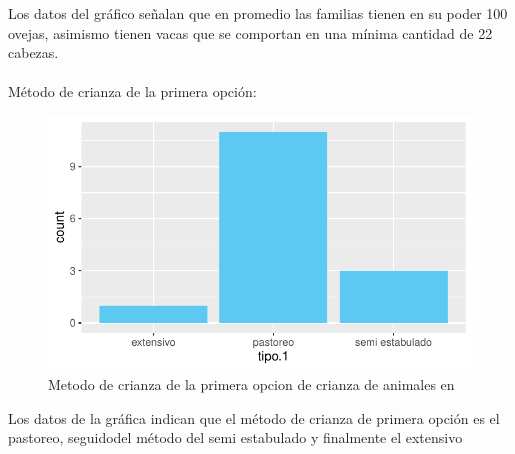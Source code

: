 \documentclass[12pt]{article}\usepackage[]{graphicx}\usepackage[]{xcolor}
\makeatletter
\def\maxwidth{ %
  \ifdim\Gin@nat@width>\linewidth
    \linewidth
  \else
    \Gin@nat@width
  \fi
}
\newenvironment{knitrout}{}{} %
\makeatother
\begin{document}
	Los datos del gráfico señalan que en promedio las familias tienen en su poder 100 ovejas, asimismo tienen vacas que se comportan en una mínima cantidad de 22 cabezas.\\
	\\
	Método de crianza de la primera opción: 
	\begin{figure}[H]
	\centering
\begin{knitrout}
\color{fgcolor}
\includegraphics[width=\maxwidth]{figure/seventeen-1} 
\end{knitrout}
	\caption{Metodo de crianza de la primera opcion de crianza de animales en \comunidad}
	\end{figure}
	Los datos de la gráfica indican que el método de crianza de primera opción es el pastoreo, seguidodel método del semi estabulado y finalmente el extensivo\\
	\\
	
\end{document}
